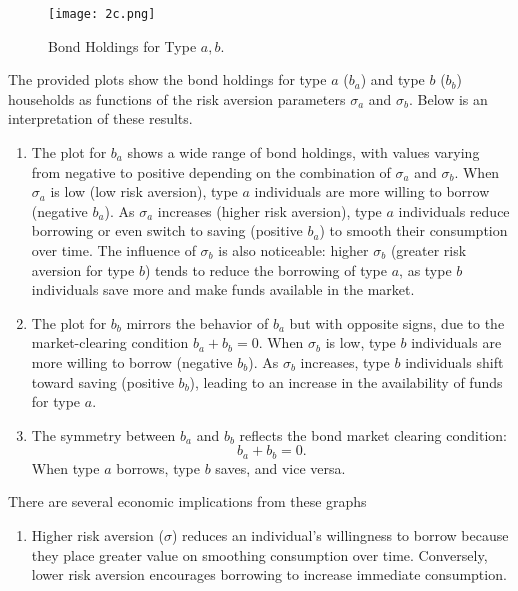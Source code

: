\documentclass[12pt]{article}
\begin{document}
\begin{enumerate}
\begin{figure}[h!]
    \centering
        \centering
        \texttt{[image: 2c.png]}
       \caption{Bond Holdings for Type \(a,b\).}
        \label{fig:bond_a}
\end{figure}


The provided plots show the bond holdings for type \(a\) (\(b_a\)) and type \(b\) (\(b_b\)) households as functions of the risk aversion parameters \(\sigma_a\) and \(\sigma_b\). Below is an interpretation of these results.

\begin{enumerate}
    \item %
 The plot for \(b_a\) shows a wide range of bond holdings, with values varying from negative to positive depending on the combination of \(\sigma_a\) and \(\sigma_b\).
   When \(\sigma_a\) is low (low risk aversion), type \(a\) individuals are more willing to borrow (negative \(b_a\)).
    As \(\sigma_a\) increases (higher risk aversion), type \(a\) individuals reduce borrowing or even switch to saving (positive \(b_a\)) to smooth their consumption over time.
    The influence of \(\sigma_b\) is also noticeable: higher \(\sigma_b\) (greater risk aversion for type \(b\)) tends to reduce the borrowing of type \(a\), as type \(b\) individuals save more and make funds available in the market.

    \item %
    The plot for \(b_b\) mirrors the behavior of \(b_a\) but with opposite signs, due to the market-clearing condition \(b_a + b_b = 0\).
    When \(\sigma_b\) is low, type \(b\) individuals are more willing to borrow (negative \(b_b\)).
   As \(\sigma_b\) increases, type \(b\) individuals shift toward saving (positive \(b_b\)), leading to an increase in the availability of funds for type \(a\).

\item %
   The symmetry between \(b_a\) and \(b_b\) reflects the bond market clearing condition:
     \[
     b_a + b_b = 0.
     \]
    When type \(a\) borrows, type \(b\) saves, and vice versa.
\end{enumerate}
 
There are several economic implications from these graphs 
\begin{enumerate}
 \item  %
    Higher risk aversion (\(\sigma\)) reduces an individual's willingness to borrow because they place greater value on smoothing consumption over time.
    Conversely, lower risk aversion encourages borrowing to increase immediate consumption.


\end{enumerate}
\end{enumerate}
\end{document}
